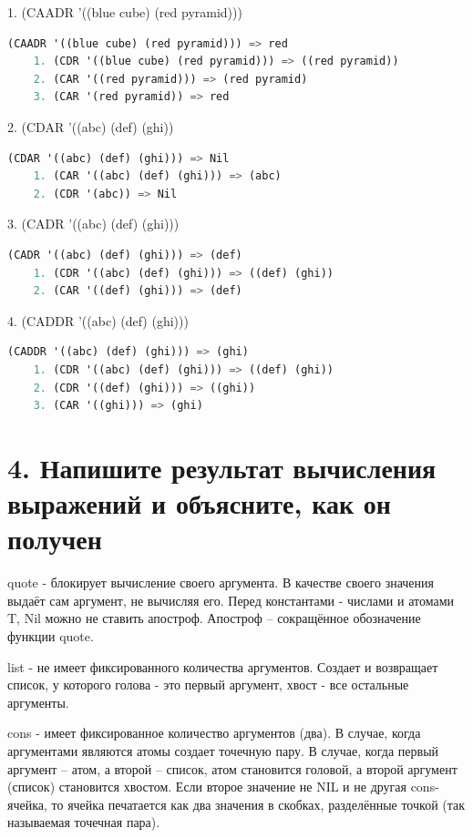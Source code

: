 \documentclass[12pt]{report}
\begin{document}
1. (CAADR '((blue cube) (red pyramid)))

\begin{lstlisting}[language=Lisp]
	(CAADR '((blue cube) (red pyramid))) => red
	1. (CDR '((blue cube) (red pyramid))) => ((red pyramid))
	2. (CAR '((red pyramid))) => (red pyramid)
	3. (CAR '(red pyramid)) => red
\end{lstlisting}

2. (CDAR '((abc) (def) (ghi))

\begin{lstlisting}[language=Lisp]
	(CDAR '((abc) (def) (ghi))) => Nil
	1. (CAR '((abc) (def) (ghi))) => (abc)
	2. (CDR '(abc)) => Nil
\end{lstlisting}

3. (CADR '((abc) (def) (ghi)))

\begin{lstlisting}[language=Lisp]
	(CADR '((abc) (def) (ghi))) => (def)
	1. (CDR '((abc) (def) (ghi))) => ((def) (ghi))
	2. (CAR '((def) (ghi))) => (def)
\end{lstlisting}


4. (CADDR '((abc) (def) (ghi)))

\begin{lstlisting}[language=Lisp]
	(CADDR '((abc) (def) (ghi))) => (ghi)
	1. (CDR '((abc) (def) (ghi))) => ((def) (ghi))
	2. (CDR '((def) (ghi))) => ((ghi))
	3. (CAR '((ghi))) => (ghi)
\end{lstlisting}


\section*{4. Напишите результат вычисления выражений и объясните, как он получен}

quote - блокирует вычисление своего аргумента. В качестве своего значения выдаёт сам аргумент, не вычисляя его. Перед константами - числами и атомами T, Nil можно не ставить апостроф. Апостроф – сокращённое обозначение функции quote.

list - не имеет фиксированного количества аргументов. Создает и возвращает список, у которого голова - это первый аргумент, хвост - все остальные аргументы.


cons - имеет фиксированное количество аргументов (два). В случае, когда аргументами являются атомы создает точечную пару. В случае, когда первый аргумент -- атом, а второй -- список, атом становится головой, а второй аргумент (список) становится хвостом. Если второе значение не NIL и не другая cons-ячейка, то ячейка печатается как два значения в скобках, разделённые точкой (так называемая точечная пара).
\end{document}
